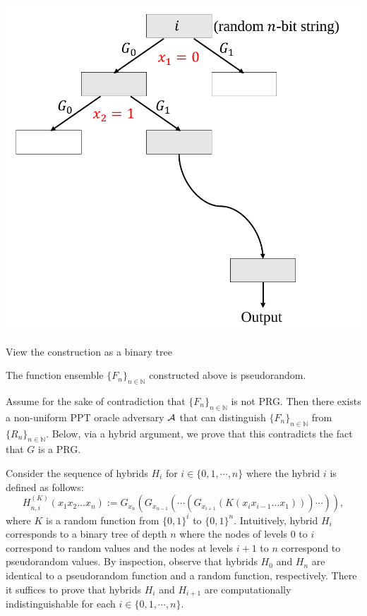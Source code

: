 \documentclass[12pt]{tufte-book}
\begin{document}
\begin{marginfigure}
    \centering
    \includegraphics[width=\textwidth]{Old Scribe Notes/binary-tree.pdf}
    \caption{View the construction as a binary tree}
    \label{fig:binary-tree}
\end{marginfigure}

\begin{theorem}\label{theorem:ggm}
The function ensemble $\{F_n\}_{n \in \mathbb{N}}$ constructed above is pseudorandom.
\end{theorem}

\proof
Assume for the sake of contradiction that $\{F_n\}_{n \in \mathbb{N}}$ is not PRG.
Then there exists a non-uniform PPT oracle adversary $\mathcal{A}$ that can distinguish $\{F_n\}_{n \in \mathbb{N}}$ from $\{R_n\}_{n \in \mathbb{N}}$. Below, via a hybrid argument, we prove that this contradicts the fact that $G$ is a PRG.

Consider the sequence of hybrids $H_i$ for $i \in \{ 0, 1, \cdots, n\}$ where the hybrid $i$ is defined as follows:
\[H_{n,i}^{(K)} (x_1x_2\ldots x_n ):= G_{x_n}(G_{x_{n-1}} (\cdots(G_{x_{i+1}}(K(x_ix_{i-1}\ldots x_1))) \cdots  )), \]
where $K$ is a random function from $\{0,1\}^{i}$ to $\{0,1\}^n$. Intuitively, hybrid $H_i$ corresponds to a binary tree of depth $n$ where the nodes of levels $0$ to $i$ correspond to random values and the nodes at levels $i+1$ to $n$ correspond to pseudorandom values. By inspection, observe that hybrids $H_0$ and $H_n$ are identical to a pseudorandom function and a random function, respectively. There it suffices to prove that hybrids $H_i$ and $H_{i+1}$ are computationally indistinguishable for each $i \in \{ 0, 1, \cdots, n\}$.
\end{document}
